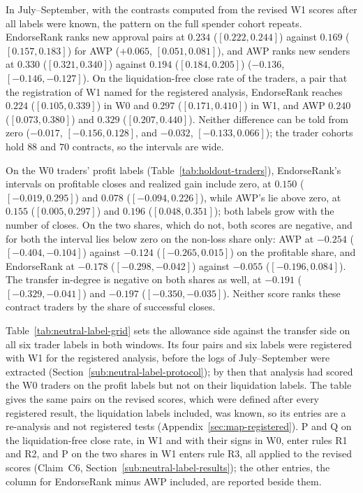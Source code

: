 In July--September, with the contrasts computed from the revised W1 scores after all labels were known, the pattern on the full spender cohort repeats. EndorseRank ranks new approval pairs at $0.234$ ($[0.222,0.244]$) against $0.169$ ($[0.157,0.183]$) for AWP ($+0.065$, $[0.051,0.081]$), and AWP ranks new senders at $0.330$ ($[0.321,0.340]$) against $0.194$ ($[0.184,0.205]$) ($-0.136$, $[-0.146,-0.127]$). On the liquidation-free close rate of the traders, a pair that the registration of W1 named for the registered analysis, EndorseRank reaches $0.224$ ($[0.105,0.339]$) in W0 and $0.297$ ($[0.171,0.410]$) in W1, and AWP $0.240$ ($[0.073,0.380]$) and $0.329$ ($[0.207,0.440]$). Neither difference can be told from zero ($-0.017$, $[-0.156,0.128]$, and $-0.032$, $[-0.133,0.066]$); the trader cohorts hold $88$ and $70$ contracts, so the intervals are wide.

On the W0 traders' profit labels (Table~\ref{tab:holdout-traders}), EndorseRank's intervals on profitable closes and realized gain include zero, at $0.150$ ($[-0.019,0.295]$) and $0.078$ ($[-0.094,0.226]$), while AWP's lie above zero, at $0.155$ ($[0.005,0.297]$) and $0.196$ ($[0.048,0.351]$); both labels grow with the number of closes. On the two shares, which do not, both scores are negative, and for both the interval lies below zero on the non-loss share only: AWP at $-0.254$ ($[-0.404,-0.104]$) against $-0.124$ ($[-0.265,0.015]$) on the profitable share, and EndorseRank at $-0.178$ ($[-0.298,-0.042]$) against $-0.055$ ($[-0.196,0.084]$). The transfer in-degree is negative on both shares as well, at $-0.191$ ($[-0.329,-0.041]$) and $-0.197$ ($[-0.350,-0.035]$). Neither score ranks these contract traders by the share of successful closes.


Table~\ref{tab:neutral-label-grid} sets the allowance side against the transfer side on all six trader labels in both windows. Its four pairs and six labels were registered with W1 for the registered analysis, before the logs of July--September were extracted (Section~\ref{sub:neutral-label-protocol}); by then that analysis had scored the W0 traders on the profit labels but not on their liquidation labels. The table gives the same pairs on the revised scores, which were defined after every registered result, the liquidation labels included, was known, so its entries are a re-analysis and not registered tests (Appendix~\ref{sec:map-registered}). P and Q on the liquidation-free close rate, in W1 and with their signs in W0, enter rules R1 and R2, and P on the two shares in W1 enters rule R3, all applied to the revised scores (Claim~C6, Section~\ref{sub:neutral-label-results}); the other entries, the column for EndorseRank minus AWP included, are reported beside them.

